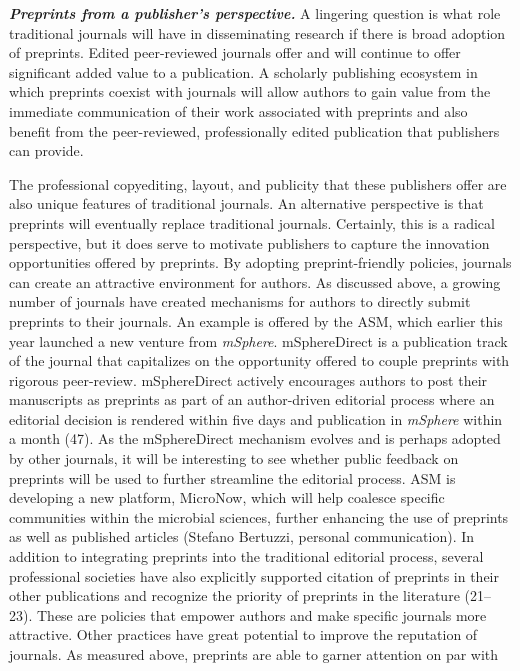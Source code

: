 \documentclass[11,]{article}
\begin{document}
\textbf{\emph{Preprints from a publisher's perspective.}} A lingering
question is what role traditional journals will have in disseminating
research if there is broad adoption of preprints. Edited peer-reviewed
journals offer and will continue to offer significant added value to a
publication. A scholarly publishing ecosystem in which preprints coexist
with journals will allow authors to gain value from the immediate
communication of their work associated with preprints and also benefit
from the peer-reviewed, professionally edited publication that
publishers can provide.

The professional copyediting, layout, and publicity that these
publishers offer are also unique features of traditional journals. An
alternative perspective is that preprints will eventually replace
traditional journals. Certainly, this is a radical perspective, but it
does serve to motivate publishers to capture the innovation
opportunities offered by preprints. By adopting preprint-friendly
policies, journals can create an attractive environment for authors. As
discussed above, a growing number of journals have created mechanisms
for authors to directly submit preprints to their journals. An example
is offered by the ASM, which earlier this year launched a new venture
from \emph{mSphere}. mSphereDirect is a publication track of the journal
that capitalizes on the opportunity offered to couple preprints with
rigorous peer-review. mSphereDirect actively encourages authors to post
their manuscripts as preprints as part of an author-driven editorial
process where an editorial decision is rendered within five days and
publication in \emph{mSphere} within a month (47). As the mSphereDirect
mechanism evolves and is perhaps adopted by other journals, it will be
interesting to see whether public feedback on preprints will be used to
further streamline the editorial process. ASM is developing a new
platform, MicroNow, which will help coalesce specific communities within
the microbial sciences, further enhancing the use of preprints as well
as published articles (Stefano Bertuzzi, personal communication). In
addition to integrating preprints into the traditional editorial
process, several professional societies have also explicitly supported
citation of preprints in their other publications and recognize the
priority of preprints in the literature (21--23). These are policies
that empower authors and make specific journals more attractive. Other
practices have great potential to improve the reputation of journals. As
measured above, preprints are able to garner attention on par with
\end{document}

